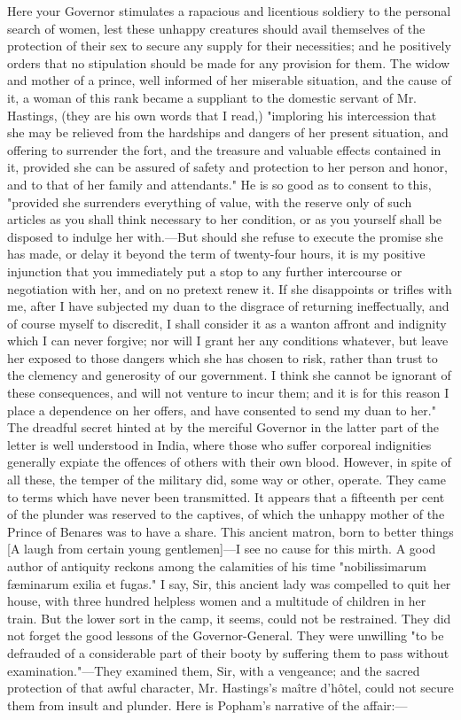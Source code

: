 Here your Governor stimulates a rapacious and licentious soldiery to the personal search of women, lest these unhappy creatures should avail themselves of the protection of their sex to secure any supply for their necessities; and he positively orders that no stipulation should be made for any provision for them. The widow and mother of a prince, well informed of her miserable situation, and the cause of it, a woman of this rank became a suppliant to the domestic servant of Mr. Hastings, (they are his own words that I read,) "imploring his intercession that she may be relieved from the hardships and dangers of her present situation, and offering to surrender the fort, and the treasure and valuable effects contained in it, provided she can be assured of safety and protection to her person and honor, and to that of her family and attendants." He is so good as to consent to this, "provided she surrenders everything of value, with the reserve only of such articles as you shall think necessary to her condition, or as you yourself shall be disposed to indulge her with.—But should she refuse to execute the promise she has made, or delay it beyond the term of twenty-four hours, it is my positive injunction that you immediately put a stop to any further intercourse or negotiation with her, and on no pretext renew it. If she disappoints or trifles with me, after I have subjected my duan to the disgrace of returning ineffectually, and of course myself to discredit, I shall consider it as a wanton affront and indignity which I can never forgive; nor will I grant her any conditions whatever, but leave her exposed to those dangers which she has chosen to risk, rather than trust to the clemency and generosity of our government. I think she cannot be ignorant of these consequences, and will not venture to incur them; and it is for this reason I place a dependence on her offers, and have consented to send my duan to her." The dreadful secret hinted at by the merciful Governor in the latter part of the letter is well understood in India, where those who suffer corporeal indignities generally expiate the offences of others with their own blood. However, in spite of all these, the temper of the military did, some way or other, operate. They came to terms which have never been transmitted. It appears that a fifteenth per cent of the plunder was reserved to the captives, of which the unhappy mother of the Prince of Benares was to have a share. This ancient matron, born to better things [A laugh from certain young gentlemen]—I see no cause for this mirth. A good author of antiquity reckons among the calamities of his time "nobilissimarum fæminarum exilia et fugas." I say, Sir, this ancient lady was compelled to quit her house, with three hundred helpless women and a multitude of children in her train. But the lower sort in the camp, it seems, could not be restrained. They did not forget the good lessons of the Governor-General. They were unwilling "to be defrauded of a considerable part of their booty by suffering them to pass without examination."—They examined them, Sir, with a vengeance; and the sacred protection of that awful character, Mr. Hastings's maître d'hôtel, could not secure them from insult and plunder. Here is Popham's narrative of the affair:—

